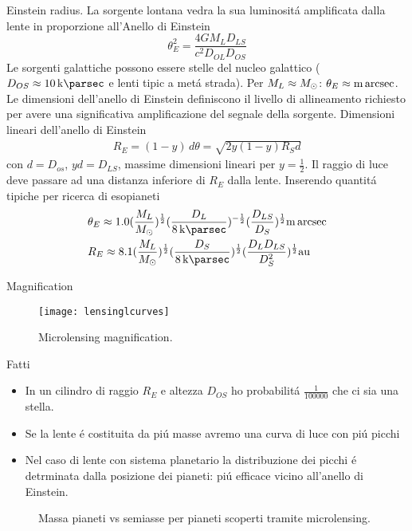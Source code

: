 \begin{frame}{Einstein radius.}
La sorgente lontana vedra la sua luminosit\'a amplificata dalla lente in proporzione all'Anello di Einstein
\begin{equation*}
    \theta_E^2=\frac{4GM_LD_{LS}}{c^2D_{OL}D_{OS}}
\end{equation*}
Le sorgenti galattiche possono essere stelle del nucleo galattico ($D_{OS}\approx\SI{10}{\kilo\parsec}$ e lenti tipic a met\'a strada).
Per $M_L\approx\msun{}$: $\theta_E\approx\si{\milli\arcsec}$.
Le dimensioni dell'anello di Einstein definiscono il livello di allineamento richiesto per avere una significativa amplificazione del segnale della sorgente.
Dimensioni lineari dell'anello di Einstein
\begin{align*}
    R_E=(1-y)\,d\theta=\sqrt{2y(1-y)R_Sd}
\end{align*}
con $d=D_{os}$, $yd=D_{LS}$, massime dimensioni lineari per $y=\frac{1}{2}$.
Il raggio di luce deve passare ad una distanza inferiore di $R_E$ dalla lente.
Inserendo quantit\'a tipiche per ricerca di esopianeti
\begin{align*}
&\theta_E\approx1.0(\frac{M_L}{\msun{}})\expy{\frac{1}{2}}(\frac{D_L}{\SI{8}{\kilo\parsec}})\expy{-\frac{1}{2}}(\frac{D_{LS}}{D_S})\expy{\frac{1}{2}}\si{\milli\arcsec}\\
&R_E\approx8.1(\frac{M_L}{\msun{}})\expy{\frac{1}{2}}(\frac{D_S}{\SI{8}{\kilo\parsec}})\expy{\frac{1}{2}}(\frac{D_LD_{LS}}{D_S^2})\expy{\frac{1}{2}}\si{\astronomicalunit}
\end{align*}
\end{frame}

\begin{frame}{Magnification}
\begin{figure}[!ht]
\centering
\texttt{[image: lensinglcurves]}
\caption{Microlensing magnification.}
\end{figure}
\end{frame}

\begin{frame}{Fatti}
\begin{itemize}
    \item In un cilindro di raggio $R_E$ e altezza $D_{OS}$ ho probabilit\'a $\frac{1}{100000}$ che ci sia una stella.
    \item Se la lente \'e costituita da pi\'u masse avremo una curva di luce con pi\'u picchi
    \item Nel caso di lente con sistema planetario la distribuzione dei picchi \'e detrminata dalla posizione dei pianeti: pi\'u efficace vicino all'anello di Einstein.
\end{itemize}
\begin{figure}[!ht]
\centering
\caption{Massa pianeti vs semiasse per pianeti scoperti tramite microlensing.}
\end{figure}
\end{frame}

